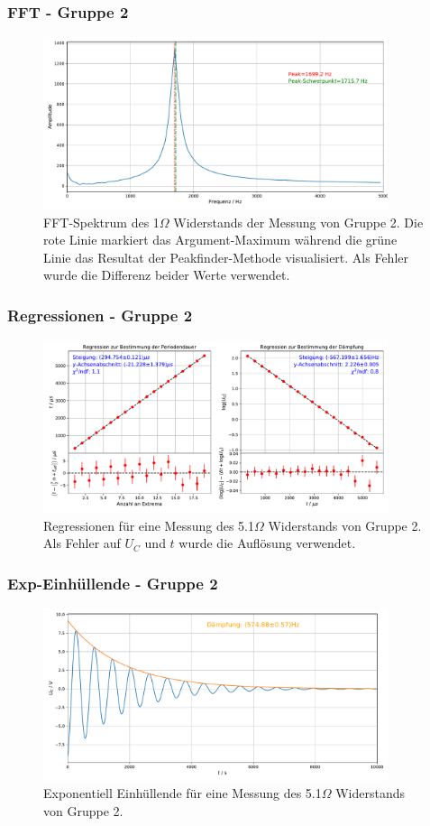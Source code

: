 \documentclass{beamer}
\begin{document}
\begin{frame}
\frametitle{FFT - Gruppe 2}
\begin{figure}
\centering
\includegraphics[width=0.9\textwidth]{abbildungen/fft_schwingung_grp2.pdf}
\caption{FFT-Spektrum des 1$\Omega$ Widerstands der Messung von Gruppe 2. Die rote Linie markiert das Argument-Maximum während die grüne Linie das Resultat der Peakfinder-Methode visualisiert. Als Fehler wurde die Differenz beider Werte verwendet.}
\end{figure}
\end{frame}

\begin{frame}
\frametitle{Regressionen - Gruppe 2}
\begin{figure}
\centering
\includegraphics[width=0.9\textwidth]{abbildungen/reg_schwingung_grp2.pdf}
\caption{Regressionen für eine Messung des 5.1$\Omega$ Widerstands von Gruppe 2. Als Fehler auf $U_C$ und $t$ wurde die Auflösung verwendet.}
\end{figure}
\end{frame}

\begin{frame}
\frametitle{Exp-Einhüllende - Gruppe 2}
\begin{figure}
\centering
\includegraphics[width=0.9\textwidth]{abbildungen/exp_grp2.pdf}
\caption{Exponentiell Einhüllende für eine Messung des 5.1$\Omega$ Widerstands von Gruppe 2.}
\end{figure}
\end{frame}
\end{document}
